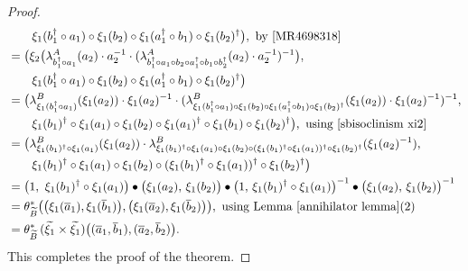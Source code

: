\documentclass{jonasart}
\theoremstyle{plain}
\begin{document}
\begin{proof}
\begin{align*}
			&\qquad \xi_1 (b_1^\dagger\circ a_1 )\circ\xi_1 ( b_2 )\circ \xi_1 (a_1^\dagger\circ b_1 ) \circ \xi_1 (b_2 )^\dagger \big), \text{ by \cite[Proposition 3.9]{MR4698318}}\\
			&= \big(\xi_2 \big(\lambda^A_{b_1^\dagger\circ a_1}(a_2 )\cdot a_2^{-1} \cdot (\lambda^A_{b_1^\dagger\circ a_1\circ b_2\circ a_1^\dagger\circ b_1 \circ b_2^\dagger}(a_2 )\cdot a_2^{-1})^{-1} \big), \\
			&\qquad\xi_1 (b_1^\dagger\circ a_1 )\circ\xi_1 ( b_2 )\circ \xi_1 (a_1^\dagger\circ b_1 ) \circ \xi_1 (b_2 )^\dagger \big)\\
			&= \big(\lambda^B_{\xi_1 (b_1^\dagger\circ a_1 )}(\xi_1 (a_2 )) \cdot \xi_1 (a_2 )^{-1} \cdot (\lambda^B_{\xi_1 (b_1^\dagger\circ a_1 )\circ \xi_1 (b_2 )\circ \xi_1 (a_1^\dagger\circ b_1 ) \circ \xi_1 (b_2 )^\dagger}(\xi_1 (a_2 )) \cdot \xi_1 (a_2 )^{-1})^{-1},\\
			&\qquad\xi_1 (b_1 )^\dagger\circ \xi_1 (a_1 )\circ\xi_1 ( b_2 )\circ \xi_1 (a_1 )^\dagger\circ\xi_1 ( b_1 ) \circ \xi_1 (b_2 )^\dagger \big), \text{ using \eqref{sbisoclinism xi2}}\\
			&= \big(\lambda^B_{\xi_1 (b_1 )^\dagger\circ \xi_1 (a_1 )}(\xi_1 (a_2 )) \cdot \lambda^B_{\xi_1 (b_1 )^\dagger\circ\xi_1 (a_1 )\circ \xi_1 (b_2 )\circ (\xi_1 (b_1 )^\dagger\circ\xi_1 (a_1 ))^\dagger \circ \xi_1 (b_2 )^\dagger}(\xi_1 (a_2 )^{-1}),~\\
			&\qquad\xi_1 (b_1 )^\dagger\circ \xi_1 (a_1 )\circ\xi_1 ( b_2 )\circ (\xi_1 (b_1 )^\dagger\circ\xi_1 (a_1 ))^\dagger \circ \xi_1 (b_2 )^\dagger \big)\\
			&= \big(1,~\xi_1 (b_1 )^\dagger\circ \xi_1 (a_1 ) \big) \bullet \big(\xi_1 (a_2 ), \, \xi_1 (b_2 )\big) \bullet \big(1,\, \xi_1 (b_1 )^\dagger\circ \xi_1 (a_1 )\big)^{-1} \bullet \big(\xi_1 (a_2 ),\, \xi_1 (b_2 )\big)^{-1}\\
			&=\theta^*_{\widetilde{B}} \big( \big(\xi_1 (\overline{a}_1 ), \xi_1 (\overline{b}_1 ) \big), \big(\xi_1 (\overline{a}_2 ), \xi_1 (\overline{b}_2 ) \big) \big), \text{ using Lemma \eqref{annihilator lemma}(2)}\\
			&= \theta^*_{\widetilde{B}}\, (\widetilde{\xi_1} \times \widetilde{\xi_1} ) \big((\overline{a}_1,\overline{b}_1 ), (\overline{a}_2,\overline{b}_2 ) \big).
		\end{align*}
		This completes the proof of the theorem.
	\end{proof}
	
\end{document}
